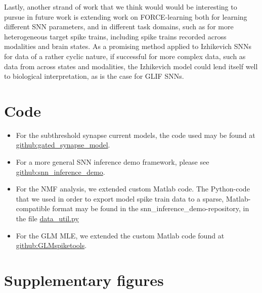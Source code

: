 \documentclass[mphil,deptreport,ianc]{infthesis} %
\begin{document}
Lastly, another strand of work that we think would would be interesting to pursue in future work is extending work on FORCE-learning both for learning different SNN parameters, and in different task domains, such as for more heterogeneous target spike trains, including spike trains recorded across modalities and brain states.
As a promising method applied to Izhikevich SNNs for data of a rather cyclic nature, if successful for more complex data, such as data from across states and modalities, the Izhikevich model could lend itself well to biological interpretation, as is the case for GLIF SNNs.






\appendix

\chapter{Code}
\label{appendix:code}

\begin{itemize}
    \item For the subthreshold synapse current models, the code used may be found at \href{https://github.com/williampeer/gated_synapse_model}{github:gated\_synapse\_model}.
    \item For a more general SNN inference demo framework, please see \href{https://github.com/williampeer/snn_inference_demo}{github:snn\_inference\_demo}.
    \item For the NMF analysis, we extended custom Matlab code. The Python-code that we used in order to export model spike train data to a sparse, Matlab-compatible format may be found in the snn\_inference\_demo-repository, in the file \href{https://github.com/williampeer/snn_inference_demo/blob/master/data_util.py}{data\_util.py}
    \item For the GLM MLE, we extended the custom Matlab code found at \href{https://github.com/pillowlab/GLMspiketools}{github:GLMspiketools}.
\end{itemize}



\chapter{Supplementary figures}
\label{appendix:supplementary_material}
\end{document}
